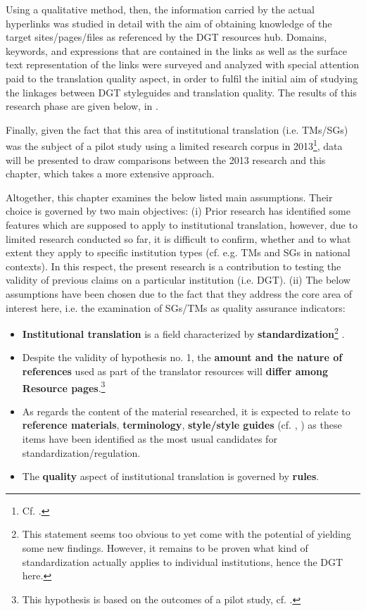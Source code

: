 \documentclass[output=paper]{langsci/langscibook}
\begin{document}
Using a qualitative method, then, the information carried by the actual hyperlinks was studied in detail with the aim of obtaining knowledge of the target sites/pages/files as referenced by the DGT resources hub. Domains, keywords, and expressions that are contained in the links as well as the surface text representation of the links were surveyed and analyzed with special attention paid to the translation quality aspect, in order to fulfil the initial aim of studying the linkages between DGT styleguides and translation quality. The results of this research phase are given below, in .

Finally, given the fact that this area of institutional translation (i.e. TMs/SGs) was the subject of a pilot study using a limited research corpus in 2013\footnote{Cf. \citealt{Svoboda2013}.}, data will be presented to draw comparisons between the 2013 research and this chapter, which takes a more extensive approach.

Altogether, this chapter examines the below listed main assumptions. Their choice is governed by two main objectives: (i) Prior research has identified some features which are supposed to apply to institutional translation, however, due to limited research conducted so far, it is difficult to confirm, whether and to what extent they apply to specific institution types (cf. e.g. TMs and SGs in national contexts). In this respect, the present research is a contribution to testing the validity of previous claims on a particular institution (i.e. DGT). (ii) The below assumptions have been chosen due to the fact that they address the core area of interest here, i.e. the examination of SGs/TMs as quality assurance indicators:

\begin{itemize}
\item 
\textbf{Institutional translation} is a field characterized by \textbf{standardization}\footnote{This statement seems too obvious to yet come with the potential of yielding some new findings. However, it remains to be proven what kind of standardization actually applies to individual institutions, hence the DGT here.} \citep[58]{Koskinen2011}.
\item 
Despite the validity of hypothesis no. 1, the \textbf{amount and the nature of references} used as part of the translator resources will \textbf{differ among Resource pages}.\footnote{This hypothesis is based on the outcomes of a pilot study, cf. \citet{Svoboda2013}.}
\item 
As regards the content of the material researched, it is expected to relate to \textbf{reference materials}, \textbf{terminology}, \textbf{style/style guides} (cf. \citealt{Koskinen2008}, \citealt{Schäffner2014}) as these items have been identified as the most usual candidates for standardization/regulation.
\item 
The \textbf{quality} aspect of institutional translation is governed by \textbf{rules}.
\end{itemize}
\end{document}
